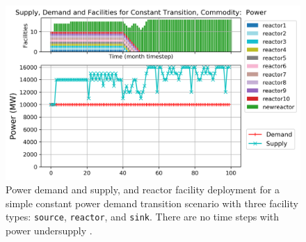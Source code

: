     \begin{figure}[]
        \centering
        \includegraphics[width=0.9\linewidth]{figures/constanttransition-power.png} 
            \caption{Power demand and supply, and reactor facility deployment for  
            a simple constant power demand transition scenario with 
            three facility types: \texttt{source}, \texttt{reactor}, and \texttt{sink}.
            There are no time steps with power undersupply 
            \cite{chee_arfc/transition-scenarios_2018}.}
            \label{fig:constanttransition-power}
    \end{figure}

